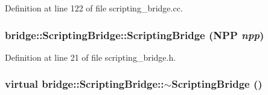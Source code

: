 Definition at line 122 of file scripting\_\-bridge.cc.

\hypertarget{classbridge_1_1_scripting_bridge_a9f6cceea3738d76e33f47ba8ad5f72d9}{
\subsubsection[{ScriptingBridge}]{\setlength{\rightskip}{0pt plus 5cm}bridge::ScriptingBridge::ScriptingBridge (NPP {\em npp})}}
\label{classbridge_1_1_scripting_bridge_a9f6cceea3738d76e33f47ba8ad5f72d9}


Definition at line 21 of file scripting\_\-bridge.h.

\hypertarget{classbridge_1_1_scripting_bridge_ac47a1623f245bd55f96ea8cb007b24cb}{
\subsubsection[{$\sim$ScriptingBridge}]{\setlength{\rightskip}{0pt plus 5cm}virtual bridge::ScriptingBridge::$\sim$ScriptingBridge ()}}
\label{classbridge_1_1_scripting_bridge_ac47a1623f245bd55f96ea8cb007b24cb}


